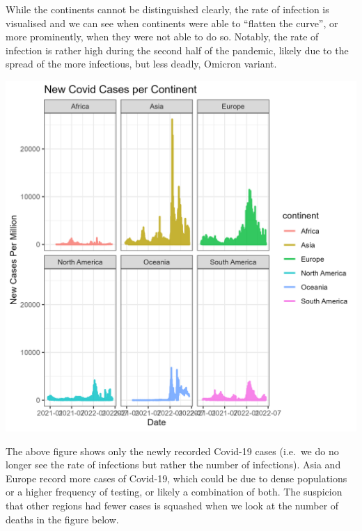 \documentclass[11pt,preprint, authoryear]{elsarticle}
\numberwithin{equation}{section}
\numberwithin{figure}{section}
\numberwithin{table}{section}
\begin{document}
While the continents cannot be distinguished clearly, the rate of
infection is visualised and we can see when continents were able to
``flatten the curve'', or more prominently, when they were not able to
do so. Notably, the rate of infection is rather high during the second
half of the pandemic, likely due to the spread of the more infectious,
but less deadly, Omicron variant.

\hfill

\includegraphics{Figures/Figure2.png} \hfill

The above figure shows only the newly recorded Covid-19 cases (i.e.~we
do no longer see the rate of infections but rather the number of
infections). Asia and Europe record more cases of Covid-19, which could
be due to dense populations or a higher frequency of testing, or likely
a combination of both. The suspicion that other regions had fewer cases
is squashed when we look at the number of deaths in the figure below.

\hfill
\end{document}

